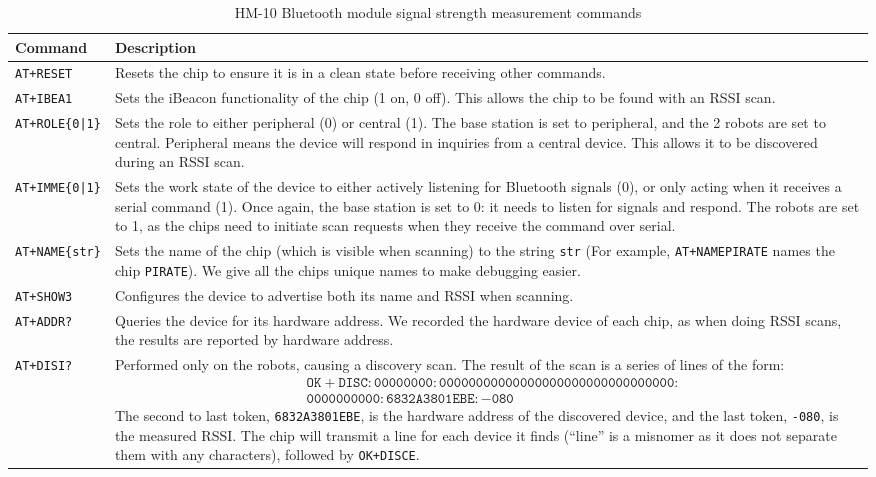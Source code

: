 \documentclass[]{article}
\newcommand{\ra}[1]{\renewcommand{\arraystretch}{#1}}
\begin{document}
\begin{table}[]
\centering
\ra{1.3}
\caption{HM-10 Bluetooth module signal strength measurement commands}
\label{table:blecommands}
\begin{tabularx}{\textwidth}{@{}l X@{}}
\toprule
Command & Description \\ \midrule
\texttt{AT+RESET} & Resets the chip to ensure it is in a clean state
before receiving other commands. \\

\texttt{AT+IBEA1} & Sets the iBeacon functionality of the chip (1 on, 0 off).
This allows the chip to be found with an RSSI scan. \\

\texttt{AT+ROLE\{0|1\}} & Sets the role to either peripheral (0) or central (1).
The base station is set to peripheral, and the 2 robots are set to central.
Peripheral means the device will respond in inquiries from a central device.
This allows it to be discovered during an RSSI scan.\\

\texttt{AT+IMME\{0|1\}} & Sets the work state of the device to either actively
listening for Bluetooth signals (0), or only acting when it receives a serial
command (1). Once again, the base station is set to 0: it needs to listen for
signals and respond. The robots are set to 1, as the chips need to initiate scan
requests when they receive the command over serial. \\

\texttt{AT+NAME\{str\}} & Sets the name of the chip (which is visible when
scanning) to the string \texttt{str} (For example, \texttt{AT+NAMEPIRATE} names
the chip \texttt{PIRATE}). We give all the chips unique names to make
debugging easier. \\

\texttt{AT+SHOW3} & Configures the device to advertise both its name
and RSSI when scanning. \\

\texttt{AT+ADDR?} & Queries the device for its hardware address. We
recorded the hardware device of each chip, as when doing RSSI scans,
the results are reported by hardware address. \\

\texttt{AT+DISI?} & Performed only on the robots, causing a discovery
scan. The result of the scan is a series of lines of the form:
{\begin{align*}
&\mathtt{OK+DISC:00000000:00000000000000000000000000000000:}\\
&\mathtt{  0000000000:6832A3801EBE:-080}
\end{align*}}
The second to last token, \texttt{6832A3801EBE}, is the hardware
address of the discovered device, and the last token, \texttt{-080},
is the measured RSSI. The chip will transmit a line for each device it
finds (``line'' is a misnomer as it does not separate them with any
characters), followed by \texttt{OK+DISCE}. \\
\bottomrule
\end{tabularx}
\end{table}
\end{document}

